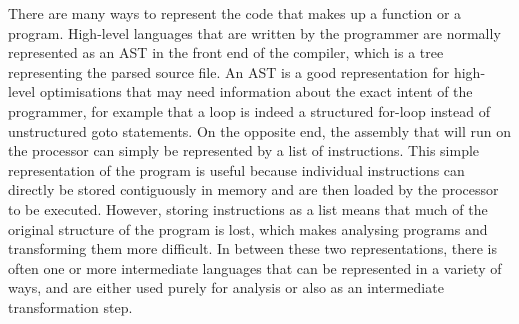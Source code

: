 There are many ways to represent the code that makes up a function or a program.
High-level languages that are written by the programmer are normally represented
as an \gls{AST} in the front end of the compiler, which is a tree representing
the parsed source file.  An \gls{AST} is a good representation for high-level
optimisations that may need information about the exact intent of the
programmer, for example that a loop is indeed a structured for-loop instead of
unstructured goto statements.  On the opposite end, the assembly that will run
on the processor can simply be represented by a list of instructions.  This
simple representation of the program is useful because individual instructions
can directly be stored contiguously in memory and are then loaded by the
processor to be executed.  However, storing instructions as a list means that
much of the original structure of the program is lost, which makes analysing
programs and transforming them more difficult.  In between these two
representations, there is often one or more intermediate languages that can be
represented in a variety of ways, and are either used purely for analysis or
also as an intermediate transformation step.



